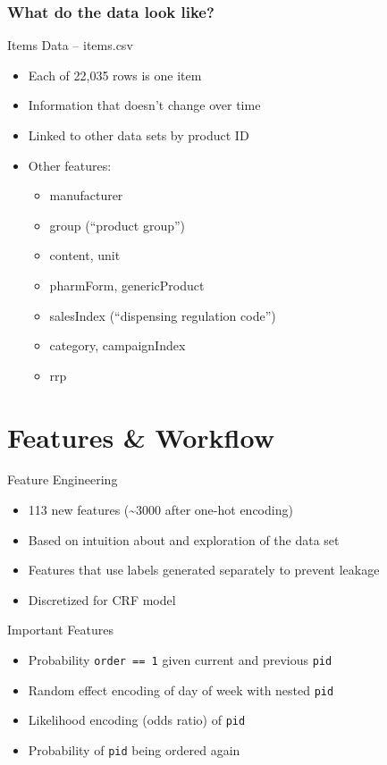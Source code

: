 \documentclass{beamer}
\begin{document}
\begin{frame}
  \frametitle{What do the data look like?}
  \begin{block}{Items Data -- items.csv} 
    \begin{itemize}
      \item Each of 22,035 rows is one item
      \item Information that doesn't change over time
      \item Linked to other data sets by product ID
      \item Other features:
        \begin{itemize}
          \item manufacturer
          \item group (``product group'')
          \item content, unit
          \item pharmForm, genericProduct
          \item salesIndex (``dispensing regulation code'')
          \item category, campaignIndex
          \item rrp
        \end{itemize}
    \end{itemize}
  \end{block}
\end{frame}

\section{Features \& Workflow} %

\begin{frame}{Feature Engineering}
  \begin{itemize}
    \item 113 new features (\sim 3000 after one-hot encoding)
    \item Based on intuition about and exploration of the data set
    \item Features that use labels generated separately to prevent leakage
    \item Discretized for CRF model
  \end{itemize}
\end{frame}

\begin{frame}{Important Features}
  \begin{itemize}
    \item Probability \texttt{order == 1} given current and previous
      \texttt{pid}
    \item Random effect encoding of day of week with nested \texttt{pid} 
    \item Likelihood encoding (odds ratio) of \texttt{pid}
    \item Probability of \texttt{pid} being ordered again
  \end{itemize}
\end{frame}
\end{document}
